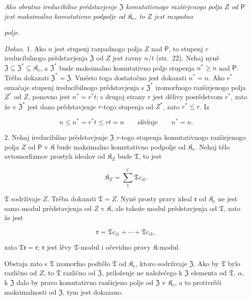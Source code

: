 \documentclass[11pt]{article}
\begin{document}
\emph{Ako obratno ireducibilno prědstavjenje \(\mathfrak Z\) komutativnogo razširjenogo polja \(Z\) od \(\mathsf P\) jest maksimalno komutativno podpolje od \(\mathfrak K_r\), to \(Z\) jest razpadno}

\emph{polje.}

\emph{Dokaz.} 1. Ako \(n\) jest stupenj razpadnogo polja \(Z\) nad \(\mathsf P\), to stupenj \(r\) ireducibilnogo prědstavjenja \(\mathfrak Z\) od \(Z\) jest ravny \(n/t\) (str.~22). Nehaj nyně \(\mathfrak Z\subseteq\mathfrak Z^*\subseteq\mathfrak K_r\), a \(\mathfrak Z^*\) bude maksimalno komutativno polje stupenja \(n^*\geq n\) nad \(\mathsf P\). Trěba dokazati \(\mathfrak Z^*=\mathfrak Z\). Vměsto toga dostatočno jest dokazati \(n^*=n\). Ako \(r^*\) označaje stupenj ireducibilnogo prědstavjenja s \(\mathfrak Z^*\) izomorfnogo razširjenogo polja \(Z^*\) od \(Z\), ponovno jest \(n^*=r^*t\); s drugoj strany \(r\) jest dělivy posrědstvom \(r^*\), zato že v \(\mathfrak Z^*\) jest dano prědstavjenje \(r\)-togo stupenja od \(Z^*\), zato \(r^*\leq r\). Iz

\[
n\leq n^*=r^*t\leq rt=n \qquad\text{slěduje}\qquad n^*=n.
\]

2. Nehaj ireducibilno prědstavjenje \(\mathfrak Z\) \(r\)-togo stupenja komutativnogo razširjenogo polja \(Z\) od \(\mathsf P\) v \(\mathfrak K\) bude maksimalno komutativno podpolje od \(\mathfrak K_r\). Nehaj tělo avtomorfizmov prostyh idealov od \(\mathfrak K_Z\) bude \(\mathfrak T\), to jest

\[
\mathfrak K_Z=\sum_{1}^{t'}\mathfrak T c_{ik}.
\]

\(\mathfrak T\) sodrživaje \(Z\). Trěba dokazati \(\mathfrak T=Z\). Nyně prosty pravy ideal \(\mathfrak r\) od \(\mathfrak K_r\) ne jest samo modul prědstavjenja od \(Z\) v \(\mathfrak K\), ale takože modul prědstavjenja od \(\mathfrak T\), zato že jest

\[
\mathfrak r=\mathfrak T c_{i1}+\cdots+\mathfrak T c_{ik},
\]

zato \(\mathfrak T\mathfrak r=\mathfrak r\); \(\mathfrak r\) jest lěvy \(\mathfrak T\)-modul i očevidno pravy \(\mathfrak K\)-modul.

Obstaja zato s \(\mathfrak T\) izomorfno podtělo \(\overline{\mathfrak T}\) od \(\mathfrak K_r\), ktoro sodrživaje \(\mathfrak Z\). Ako by \(\mathfrak T\) bylo različno od \(Z\), to \(\overline{\mathfrak T}\) različno od \(\mathfrak Z\), priloženje ne naležečego k \(\mathfrak Z\) elementa od \(\overline{\mathfrak T}\), \(\alpha\), k \(\mathfrak Z\) dalo by pravo komutativno razširjeno polje od \(\mathfrak Z\) v \(\mathfrak K_r\), a to protivrěči maksimalnosti od \(\mathfrak Z\), tym jest dokazano.
\end{document}
